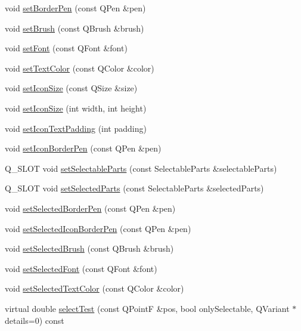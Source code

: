 \begin{DoxyCompactItemize}
\item 
void \hyperlink{classQCPLegend_a866a9e3f5267de7430a6c7f26a61db9f}{set\+Border\+Pen} (const Q\+Pen \&pen)
\item 
void \hyperlink{classQCPLegend_a497bbcd38baa3598c08e2b3f48103f23}{set\+Brush} (const Q\+Brush \&brush)
\item 
void \hyperlink{classQCPLegend_aa4cda8499e3cb0f3be415edc02984c73}{set\+Font} (const Q\+Font \&font)
\item 
void \hyperlink{classQCPLegend_ae1eb239ff4a4632fe1b6c3e668d845c6}{set\+Text\+Color} (const Q\+Color \&color)
\item 
void \hyperlink{classQCPLegend_a8b0740cce488bf7010da6beda6898984}{set\+Icon\+Size} (const Q\+Size \&size)
\item 
void \hyperlink{classQCPLegend_a96b1a37fd4ee6a9778e6e54fe56ab6c2}{set\+Icon\+Size} (int width, int height)
\item 
void \hyperlink{classQCPLegend_a62973bd69d5155e8ea3141366e8968f6}{set\+Icon\+Text\+Padding} (int padding)
\item 
void \hyperlink{classQCPLegend_a2f2c93d18a651f4ff294bb3f026f49b8}{set\+Icon\+Border\+Pen} (const Q\+Pen \&pen)
\item 
Q\+\_\+\+S\+L\+O\+T void \hyperlink{classQCPLegend_a9ce60aa8bbd89f62ae4fa83ac6c60110}{set\+Selectable\+Parts} (const Selectable\+Parts \&selectable\+Parts)
\item 
Q\+\_\+\+S\+L\+O\+T void \hyperlink{classQCPLegend_a2aee309bb5c2a794b1987f3fc97f8ad8}{set\+Selected\+Parts} (const Selectable\+Parts \&selected\+Parts)
\item 
void \hyperlink{classQCPLegend_a2c35d262953a25d96b6112653fbefc88}{set\+Selected\+Border\+Pen} (const Q\+Pen \&pen)
\item 
void \hyperlink{classQCPLegend_ade93aabe9bcccaf9cf46cec22c658027}{set\+Selected\+Icon\+Border\+Pen} (const Q\+Pen \&pen)
\item 
void \hyperlink{classQCPLegend_a875227f3219c9799464631dec5e8f1bd}{set\+Selected\+Brush} (const Q\+Brush \&brush)
\item 
void \hyperlink{classQCPLegend_ab580a01c3c0a239374ed66c29edf5ad2}{set\+Selected\+Font} (const Q\+Font \&font)
\item 
void \hyperlink{classQCPLegend_a7674dfc7a1f30e1abd1018c0ed45e0bc}{set\+Selected\+Text\+Color} (const Q\+Color \&color)
\item 
virtual double \hyperlink{classQCPLegend_aa3892801051bc7b985e003576df844db}{select\+Test} (const Q\+Point\+F \&pos, bool only\+Selectable, Q\+Variant $\ast$details=0) const 

\end{DoxyCompactItemize}

